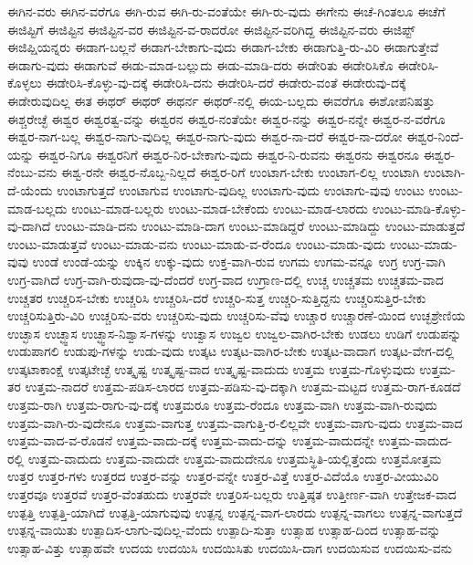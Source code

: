 {ಈಗಿನ-ವರು
ಈಗಿನ-ವರೆಗೂ
ಈಗಿ-ರುವ
ಈಗಿ-ರು-ವಂತೆಯೇ
ಈಗಿ-ರು-ವುದು
ಈಗೇನು
ಈಚೆ-ಗಿಂತಲೂ
ಈಚೆಗೆ
ಈಜಿಪ್ಟಿಗೆ
ಈಜಿಪ್ಟಿನ
ಈಜಿಪ್ಟಿನ-ವರ
ಈಜಿಪ್ಟಿನ-ವ-ರಾದರೋ
ಈಜಿಪ್ಟಿನ-ವರಿಗಿದ್ದ
ಈಜಿಪ್ಟಿನ-ವರು
ಈಜಿಪ್ಟ್
ಈಜಿಪ್ಷಿಯನ್ನರು
ಈಡಾಗ-ಬಲ್ಲನೆ
ಈಡಾಗ-ಬೇಕಾಗು-ವುದು
ಈಡಾಗ-ಬೇಕು
ಈಡಾಗುತ್ತಿ-ರು-ವಿರಿ
ಈಡಾಗುತ್ತೇವೆ
ಈಡಾಗು-ವುದು
ಈಡಾಗುವೆ
ಈಡು-ಮಾಡ-ಬಲ್ಲುದು
ಈಡು-ಮಾಡಿ-ದರು
ಈಡೇರಿತು
ಈಡೇರಿಸಿಕೊ
ಈಡೇರಿಸಿ-ಕೊಳ್ಳಲು
ಈಡೇರಿಸಿ-ಕೊಳ್ಳು-ವು-ದಕ್ಕೆ
ಈಡೇರಿಸಿ-ದನು
ಈಡೇರಿಸಿ-ದರೆ
ಈಡೇರು-ವಂತೆ
ಈಡೇರುವು-ದಕ್ಕೆ
ಈಡೇರುವುದಿಲ್ಲ
ಈತ
ಈಥರ್
ಈಥರ್
ಈಥರ್ನ
ಈಥರ್-ನಲ್ಲಿ
ಈಯ-ಬಲ್ಲದು
ಈವರೆಗೂ
ಈಶೋಪನಿಷತ್ತು
ಈಶ್ಚರೇಚ್ಛೆ
ಈಶ್ವರ
ಈಶ್ವರತ್ವ-ವನ್ನು
ಈಶ್ವರನ
ಈಶ್ವರ-ನಂತೆಯೇ
ಈಶ್ವರ-ನನ್ನು
ಈಶ್ವರ-ನನ್ನೇ
ಈಶ್ವರ-ನ-ವರೆಗೂ
ಈಶ್ವರ-ನಾಗ-ಬಲ್ಲ
ಈಶ್ವರ-ನಾಗು-ವುದಿಲ್ಲ
ಈಶ್ವರ-ನಾಗು-ವುದು
ಈಶ್ವರ-ನಾ-ದರೆ
ಈಶ್ವರ-ನಾ-ದರೋ
ಈಶ್ವರ-ನಿಂದೆ-ಯನ್ನು
ಈಶ್ವರ-ನಿಗೂ
ಈಶ್ವರನಿಗೆ
ಈಶ್ವರ-ನಿರ-ಬೇಕಾಗು-ವುದು
ಈಶ್ವರ-ನಿ-ರುವನು
ಈಶ್ವರನು
ಈಶ್ವರನೂ
ಈಶ್ವರ-ನೆಂಬು-ವನು
ಈಶ್ವ-ರನೇ
ಈಶ್ವರ-ನೊಬ್ಬ-ನಿಲ್ಲದೆ
ಈಶ್ವರ-ರಿಗೆ
ಉಂಟಾಗ-ಬೇಕು
ಉಂಟಾಗ-ಲಿಲ್ಲ
ಉಂಟಾಗಿ
ಉಂಟಾಗಿ-ದೆ-ಯೆಂದು
ಉಂಟಾಗುತ್ತದೆ
ಉಂಟಾಗುವ
ಉಂಟಾಗು-ವುದಿಲ್ಲ
ಉಂಟಾಗು-ವುದು
ಉಂಟಾಗು-ವುವು
ಉಂಟು
ಉಂಟು-ಮಾಡ-ಬಲ್ಲದು
ಉಂಟು-ಮಾಡ-ಬಲ್ಲರು
ಉಂಟು-ಮಾಡ-ಬೇಕೆಂದು
ಉಂಟು-ಮಾಡ-ಲಾರದು
ಉಂಟು-ಮಾಡಿ-ಕೊಳ್ಳು-ವು-ದಾಗಿದೆ
ಉಂಟು-ಮಾಡಿ-ದನು
ಉಂಟು-ಮಾಡಿ-ದಾಗ
ಉಂಟು-ಮಾಡಿದ್ದರೆ
ಉಂಟು-ಮಾಡಿದ್ದು
ಉಂಟು-ಮಾಡುತ್ತದೆ
ಉಂಟು-ಮಾಡುತ್ತವೆ
ಉಂಟು-ಮಾಡು-ವನು
ಉಂಟು-ಮಾಡು-ವ-ರೆಂದೂ
ಉಂಟು-ಮಾಡು-ವುದು
ಉಂಟು-ಮಾಡು-ವುವು
ಉಂಡೆ
ಉಂಡೆ-ಯನ್ನು
ಉಕ್ಕಿನ
ಉಕ್ಕು-ವುದು
ಉಕ್ತ-ವಾಗಿ-ರುವ
ಉಗಮ
ಉಗಮ-ವನ್ನೂ
ಉಗ್ರ
ಉಗ್ರ-ವಾಗಿ
ಉಗ್ರ-ವಾಗಿದೆ
ಉಗ್ರ-ವಾಗಿ-ರುವುದಾ-ವು-ದೆಂದರೆ
ಉಗ್ರ-ವಾದ
ಉಗ್ರಾಣ-ದಲ್ಲಿ
ಉಚ್ಚ
ಉಚ್ಚತಮ
ಉಚ್ಚತಮ-ವಾದ
ಉಚ್ಚತರ
ಉಚ್ಚರಿಸ-ಬೇಕು
ಉಚ್ಚರಿಸಿ
ಉಚ್ಚರಿಸಿ-ದರೆ
ಉಚ್ಚರಿ-ಸುತ್ತ
ಉಚ್ಚರಿ-ಸುತ್ತಿದ್ದನು
ಉಚ್ಚರಿಸುತ್ತಿರ-ಬೇಕು
ಉಚ್ಚರಿಸುತ್ತಿರು-ವಿರಿ
ಉಚ್ಚರಿಸು-ವರು
ಉಚ್ಚರಿಸು-ವುದು
ಉಚ್ಚರಿಸು-ವೆವು
ಉಚ್ಚಾರ
ಉಚ್ಚಾರಣೆ-ಯಿಂದ
ಉಚ್ಛಶ್ರೇಣಿಯ
ಉಚ್ಛಾಸ
ಉಚ್ಛ್ವಾಸ
ಉಚ್ಛ್ವಾಸ-ನಿಶ್ವಾಸ-ಗಳನ್ನು
ಉಚ್ವಾಸ
ಉಜ್ವಲ
ಉಜ್ವಲ-ವಾಗಿರ-ಬೇಕು
ಉಡಲು
ಉಡಿಗೆ
ಉಡುಪನ್ನು
ಉಡುಪಾಗಲಿ
ಉಡುಪು-ಗಳನ್ನು
ಉಡು-ವುದು
ಉತ್ಕಟ
ಉತ್ಕಟ-ವಾಗಿರ-ಬೇಕು
ಉತ್ಕಟ-ವಾದಾಗ
ಉತ್ಕಟ-ವೇಗ-ದಲ್ಲಿ
ಉತ್ಕಟಾಕಾಂಕ್ಷೆ
ಉತ್ಕಟೇಚ್ಛೆ
ಉತ್ಕೃಷ್ಟ
ಉತ್ಕೃಷ್ಟ-ವಾದ
ಉತ್ಕೃಷ್ಟ-ವಾದುದು
ಉತ್ತಮ
ಉತ್ತಮ-ಗೊಳ್ಳುವುದು
ಉತ್ತಮ-ತರ
ಉತ್ತಮ-ನಾದರೆ
ಉತ್ತಮ-ಪಡಿಸ-ಲಾರದ
ಉತ್ತಮ-ಪಡಿಸು-ವು-ದಕ್ಕಾಗಿ
ಉತ್ತಮ-ಮಟ್ಟದ
ಉತ್ತಮ-ರಾಗ-ಕೂಡದೆ
ಉತ್ತಮ-ರಾಗಿ
ಉತ್ತಮ-ರಾಗು-ವು-ದಕ್ಕೆ
ಉತ್ತಮರೂ
ಉತ್ತಮ-ರೆಂದೂ
ಉತ್ತಮ-ವಾಗಿ
ಉತ್ತಮ-ವಾಗಿ-ರುವುದು
ಉತ್ತಮ-ವಾಗಿ-ರು-ವುದೇನೂ
ಉತ್ತಮ-ವಾಗುತ್ತ
ಉತ್ತಮ-ವಾಗುತ್ತಿ-ರ-ಲಿಲ್ಲವೇ
ಉತ್ತಮ-ವಾಗು-ವುದು
ಉತ್ತಮ-ವಾದ
ಉತ್ತಮ-ವಾದ-ವ-ರೊಡನೆ
ಉತ್ತಮ-ವಾದು-ದಕ್ಕೆ
ಉತ್ತಮ-ವಾದು-ದನ್ನು
ಉತ್ತಮ-ವಾದುದನ್ನೇ
ಉತ್ತಮ-ವಾದುದ-ರಲ್ಲಿ
ಉತ್ತಮ-ವಾದುದು
ಉತ್ತಮ-ವಾದುದೇ
ಉತ್ತಮ-ವಾದುದೇನೂ
ಉತ್ತಮಸ್ಥಿತಿ-ಯಲ್ಲಿತ್ತೆಂದು
ಉತ್ತಮೋತ್ತಮ
ಉತ್ತರ
ಉತ್ತರ-ಗಳು
ಉತ್ತರದ
ಉತ್ತರ-ವನ್ನು
ಉತ್ತರ-ವನ್ನೇ
ಉತ್ತರ-ವಿತ್ತೆ
ಉತ್ತರ-ವಿದೆಯೊ
ಉತ್ತರ-ವೀಯುವಿರಿ
ಉತ್ತರವೂ
ಉತ್ತರವೆ
ಉತ್ತರ-ವೆಂತಹುದು
ಉತ್ತರವೇ
ಉತ್ತರಿಸ-ಬಲ್ಲರು
ಉತ್ತಿಷ್ಠತ
ಉತ್ತೀರ್ಣ-ವಾಗಿ
ಉತ್ತೇಜಕ-ವಾದ
ಉತ್ಪತ್ತಿ
ಉತ್ಪತ್ತಿ-ಯಾಗಿದೆ
ಉತ್ಪತ್ತಿ-ಯಾಗುವುವು
ಉತ್ಪನ್ನ
ಉತ್ಪನ್ನ-ವಾಗ-ಲಾರದು
ಉತ್ಪನ್ನ-ವಾಗಲು
ಉತ್ಪನ್ನ-ವಾಗುತ್ತದೆ
ಉತ್ಪನ್ನ-ವಾಯಿತು
ಉತ್ಪಾದಿಸ-ಲಾಗು-ವುದಿಲ್ಲ-ವೆಂದು
ಉತ್ಪಾದಿ-ಸುತ್ತಾ
ಉತ್ಸಾಹ
ಉತ್ಸಾಹ-ದಿಂದ
ಉತ್ಸಾಹ-ವನ್ನು
ಉತ್ಸಾಹ-ವಿತ್ತು
ಉತ್ಸಾಹವೇ
ಉದಯ
ಉದಯಿಸಿ
ಉದಯಿಸಿತು
ಉದಯಿಸಿ-ದಾಗ
ಉದಯಿಸುವ
ಉದಯಿಸು-ವನು
}
